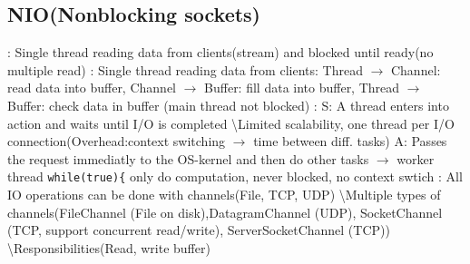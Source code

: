 \subsection*{NIO(Nonblocking sockets)}
: Single thread reading data from clients(stream) and blocked until ready(no multiple read)
: Single thread reading data from clients: Thread $\rightarrow$ Channel: read data into buffer, Channel $\rightarrow$ Buffer: fill data into buffer, Thread $\rightarrow$ Buffer: check data in buffer (main thread not blocked)
: 
S: A thread enters into action and waits until I/O is completed \textbackslash Limited scalability, one thread per I/O connection(Overhead:context switching $\rightarrow$ time between diff. tasks)
A: Passes the request immediatly to the OS-kernel and then do other tasks $\rightarrow$ worker thread \lstinline{while(true){} only do computation, never blocked, no context swtich
: All IO operations can be done with channels(File, TCP, UDP) 
\textbackslash Multiple types of channels(FileChannel (File on disk),DatagramChannel (UDP), SocketChannel (TCP, support concurrent read/write), ServerSocketChannel (TCP))
\textbackslash Responsibilities(Read, write buffer)

